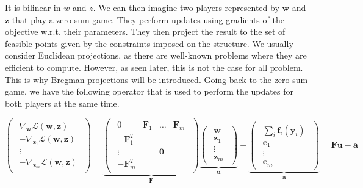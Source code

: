 \documentclass{article}
\renewcommand{\vec}{\mathbf}
\begin{document}
It is bilinear in $w$ and $z$. We can then imagine two players represented by
$\vec w$ and $\vec z$ that play a zero-sum game. They perform updates using gradients of
the objective w.r.t. their parameters. They then project the result to the set
of feasible points given by the constraints imposed on the structure. We usually
consider Euclidean projections, as there are well-known problems where they are
efficient to compute. However, as seen later, this is not the case for all
problem. This is why Bregman projections will be introduced. Going back to the
zero-sum game, we have the following operator that is used to perform the
updates for both players at the same time.

\begin{equation}
  \begin{pmatrix}
    \begin{array}{c}
      \nabla_{\vec w} \mathcal{L}(\vec w,\vec z)\\
      -\nabla_{\vec z_1} \mathcal{L}(\vec w,\vec z)\\
      \vdots\\
      -\nabla_{\vec z_m} \mathcal{L}(\vec w,\vec z)
    \end{array}
  \end{pmatrix} =
  \underbrace{
    \begin{pmatrix}
      \begin{array}{cccc}
        0 & \vec F_1 & \dots & \vec F_m\\
        -\vec F_1^T & & &\\
        \vdots & & \vec 0 &\\
        -\vec F_m^T & & &
      \end{array}
    \end{pmatrix}}_{\vec F}
  \underbrace{
    \begin{pmatrix}
      \begin{array}{c}
        \vec w\\
        \vec z_1\\
        \vdots\\
        \vec z_m
      \end{array}
    \end{pmatrix}}_{\vec u}-
  \underbrace{
    \begin{pmatrix}
      \begin{array}{c}
        \sum_i \vec f_i(\vec y_i)\\
        \vec c_1\\
        \vdots\\
        \vec c_m
      \end{array}
    \end{pmatrix}}_{\vec a} = \vec F \vec u - \vec a
\end{equation}
\end{document}
